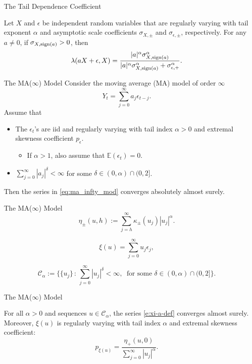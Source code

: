 \documentclass{beamer}
\def\E{\mathbb E}
\def\sign{{\rm sign}}
\def\seqSet{\mathcal{C}_{\alpha}}
\def\series{\xi}
\newcommand{\multiplier}[2]{\kappa_{#1}(#2)}
\newcommand{\normConst}[3]{\eta_{#1}({#2}, {#3})}
\begin{document}
\begin{frame}{The Tail Dependence Coefficient}
    \begin{lemma}\label{lem:lambda_lem}
        Let $X$ and $\epsilon$ be independent random variables that are regularly varying with tail exponent $\alpha$ and asymptotic scale coefficients $\sigma_{X, \pm}$ and $\sigma_{\epsilon, \pm}$, respectively. For any $a \ne 0$, if $\sigma_{X, \sign(a)} > 0$, then
        \[
        \lambda(a X + \epsilon, X) = \frac{|a|^\alpha \sigma_{X, \sign(a)}^\alpha}{|a|^\alpha \sigma_{X, \sign(a)}^\alpha + \sigma_{\epsilon, +}^\alpha}.
        \]
    \end{lemma}
\end{frame}

\begin{frame}{The MA($\infty$) Model}
    Consider the moving average (MA) model of order $\infty$
    \begin{equation}\label{eq:ma_infty_mod}
        Y_t = \sum_{j = 0}^{\infty} a_j\epsilon_{t - j}.
    \end{equation}
    Assume that
    \begin{itemize}
        \item The $\epsilon_t$'s are iid and regularly varying with tail index $\alpha > 0$ and extremal skewness coefficient $p_{\epsilon}$.
        \begin{itemize}
            \item If $\alpha > 1$, also assume that $\E(\epsilon_t) = 0$.
        \end{itemize}
        \item $\sum_{j = 0}^{\infty} |a_j|^{\delta} < \infty$ for some $\delta \in (0, \alpha) \cap (0, 2]$.
    \end{itemize}
    Then the series in \eqref{eq:ma_infty_mod} converges absolutely almost surely.
\end{frame}

\begin{frame}{The MA($\infty$) Model}
    \[
    \normConst{\pm}{u}{h} := \sum_{j = h}^{\infty} \multiplier{\pm}{u_j}|u_j|^\alpha.
    \]

    \[
    \series(u) = \sum_{j = 0}^{\infty} u_j \epsilon_j,
    \]

    \[
    \seqSet:=\Big\{ \{u_j\}\, :\, \sum_{j = 0}^{\infty} |u_j|^{\delta} < \infty,\ 
    \mbox{ for some }\delta\in(0,\alpha)\cap (0,2] \Big\}.
    \]
\end{frame}

\begin{frame}{The MA($\infty$) Model}
    \begin{lemma}
        For all $\alpha > 0$ and sequences $u \in \seqSet$, the series \eqref{e:xi-a-def} converges almost surely. Moreover, $\series(u)$ is regularly varying with tail index $\alpha$ and extremal skewness coefficient:
        \[
        p_{\series(u)} = \frac{\normConst{+}{u}{0}}{\sum_{j = 0}^{\infty} |u_j|^{\alpha}}.
        \]
    \end{lemma}
\end{frame}
\end{document}
